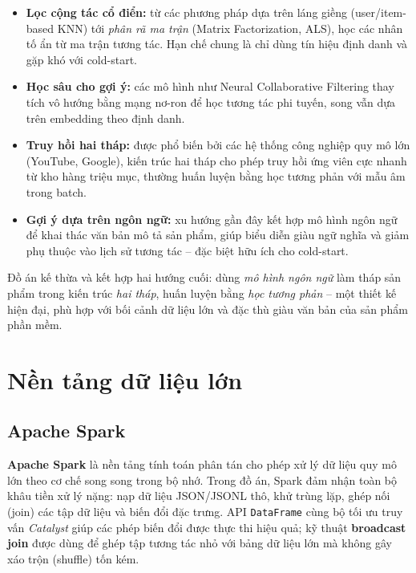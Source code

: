 \begin{itemize}[leftmargin=2em, itemsep=2pt]
    \item \textbf{Lọc cộng tác cổ điển:} từ các phương pháp dựa trên láng giềng
    (user/item-based KNN) tới \textit{phân rã ma trận} (Matrix Factorization, ALS),
    học các nhân tố ẩn từ ma trận tương tác. Hạn chế chung là chỉ dùng tín hiệu định
    danh và gặp khó với cold-start.
    \item \textbf{Học sâu cho gợi ý:} các mô hình như Neural Collaborative Filtering
    thay tích vô hướng bằng mạng nơ-ron để học tương tác phi tuyến, song vẫn dựa trên
    embedding theo định danh.
    \item \textbf{Truy hồi hai tháp:} được phổ biến bởi các hệ thống công nghiệp quy
    mô lớn (YouTube, Google), kiến trúc hai tháp cho phép truy hồi ứng viên cực nhanh
    từ kho hàng triệu mục, thường huấn luyện bằng học tương phản với mẫu âm trong
    batch.
    \item \textbf{Gợi ý dựa trên ngôn ngữ:} xu hướng gần đây kết hợp mô hình ngôn
    ngữ để khai thác văn bản mô tả sản phẩm, giúp biểu diễn giàu ngữ nghĩa và giảm
    phụ thuộc vào lịch sử tương tác -- đặc biệt hữu ích cho cold-start.
\end{itemize}

Đồ án kế thừa và kết hợp hai hướng cuối: dùng \textit{mô hình ngôn ngữ} làm tháp sản
phẩm trong kiến trúc \textit{hai tháp}, huấn luyện bằng \textit{học tương phản} --
một thiết kế hiện đại, phù hợp với bối cảnh dữ liệu lớn và đặc thù giàu văn bản của
sản phẩm phần mềm.

\section{Nền tảng dữ liệu lớn}

\subsection{Apache Spark}

\textbf{Apache Spark} là nền tảng tính toán phân tán cho phép xử lý dữ liệu quy mô
lớn theo cơ chế song song trong bộ nhớ. Trong đồ án, Spark đảm nhận toàn bộ khâu
tiền xử lý nặng: nạp dữ liệu JSON/JSONL thô, khử trùng lặp, ghép nối (join) các tập
dữ liệu và biến đổi đặc trưng. API \texttt{DataFrame} cùng bộ tối ưu truy vấn
\textit{Catalyst} giúp các phép biến đổi được thực thi hiệu quả; kỹ thuật
\textbf{broadcast join} được dùng để ghép tập tương tác nhỏ với bảng dữ liệu lớn mà
không gây xáo trộn (shuffle) tốn kém.

